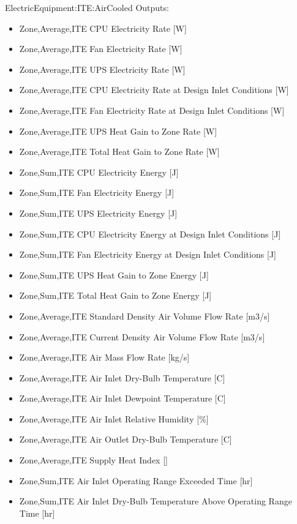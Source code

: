 ElectricEquipment:ITE:AirCooled Outputs:

\begin{itemize}
\tightlist
\item
  Zone,Average,ITE CPU Electricity Rate {[}W{]}
\item
  Zone,Average,ITE Fan Electricity Rate {[}W{]}
\item
  Zone,Average,ITE UPS Electricity Rate {[}W{]}
\item
  Zone,Average,ITE CPU Electricity Rate at Design Inlet Conditions {[}W{]}
\item
  Zone,Average,ITE Fan Electricity Rate at Design Inlet Conditions {[}W{]}
\item
  Zone,Average,ITE UPS Heat Gain to Zone Rate {[}W{]}
\item
  Zone,Average,ITE Total Heat Gain to Zone Rate {[}W{]}
\item
  Zone,Sum,ITE CPU Electricity Energy {[}J{]}
\item
  Zone,Sum,ITE Fan Electricity Energy {[}J{]}
\item
  Zone,Sum,ITE UPS Electricity Energy {[}J{]}
\item
  Zone,Sum,ITE CPU Electricity Energy at Design Inlet Conditions {[}J{]}
\item
  Zone,Sum,ITE Fan Electricity Energy at Design Inlet Conditions {[}J{]}
\item
  Zone,Sum,ITE UPS Heat Gain to Zone Energy {[}J{]}
\item
  Zone,Sum,ITE Total Heat Gain to Zone Energy {[}J{]}
\item
  Zone,Average,ITE Standard Density Air Volume Flow Rate {[}m3/s{]}
\item
  Zone,Average,ITE Current Density Air Volume Flow Rate {[}m3/s{]}
\item
  Zone,Average,ITE Air Mass Flow Rate {[}kg/s{]}
\item
  Zone,Average,ITE Air Inlet Dry-Bulb Temperature {[}C{]}
\item
  Zone,Average,ITE Air Inlet Dewpoint Temperature {[}C{]}
\item
  Zone,Average,ITE Air Inlet Relative Humidity {[}\%{]}
\item
  Zone,Average,ITE Air Outlet Dry-Bulb Temperature {[}C{]}
\item
  Zone,Average,ITE Supply Heat Index {[]}
\item
  Zone,Sum,ITE Air Inlet Operating Range Exceeded Time {[}hr{]}
\item
  Zone,Sum,ITE Air Inlet Dry-Bulb Temperature Above Operating Range Time {[}hr{]}

\end{itemize}
